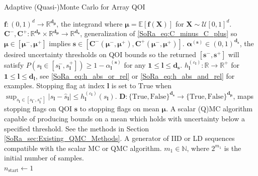 \documentclass[graybox]{svmult}
\begin{document}
\begin{algorithm}[t]
    \caption{Adaptive (Quasi-)Monte Carlo for Array QOI}
    \label{SoRa_algo:MCStoppingCriterion}
    \begin{algorithmic}
    \Require $\boldsymbol{f}: (0,1)^d \to \mathbb{R}^{\boldsymbol{d}_{\boldsymbol{\mu}}}$, the integrand where $\boldsymbol{\mu} = \mathbb{E}[\boldsymbol{f}(\boldsymbol{X})]$ for $\boldsymbol{X} \sim \mathcal{U}[0,1]^d$.
    \Require $\boldsymbol{C}^-,\boldsymbol{C}^+: \mathbb{R}^{\boldsymbol{d}_{\boldsymbol{\mu}}} \times \mathbb{R}^{\boldsymbol{d}_{\boldsymbol{\mu}}} \to \mathbb{R}^{\boldsymbol{d}_{\boldsymbol{s}}}$, generalization of \eqref{SoRa_eq:C_minus_C_plus} so $\boldsymbol{\mu} \in [\boldsymbol{\mu}^-,\boldsymbol{\mu}^+]$ implies $\boldsymbol{s} \in [\boldsymbol{C}^-(\boldsymbol{\mu}^-,\boldsymbol{\mu}^+),\boldsymbol{C}^+(\boldsymbol{\mu}^-,\boldsymbol{\mu}^+)]$.
    \Require $\boldsymbol{\alpha}^{(\boldsymbol{s})} \in (0,1)^{\boldsymbol{d}_{\boldsymbol{s}}}$, the desired uncertainty thresholds on QOI bounds so the returned $[\boldsymbol{s}^-,\boldsymbol{s}^+]$ will satisfy $P(s_{\boldsymbol{l}} \in [s_{\boldsymbol{l}}^-,s_{\boldsymbol{l}}^+]) \geq 1-\alpha^{(\boldsymbol{s})}_{\boldsymbol{l}}$ for any $\boldsymbol{1} \leq \boldsymbol{l} \leq \boldsymbol{d}_{\boldsymbol{s}}$.
    \Require $h^{(\varepsilon_{\boldsymbol{l}})}_{\boldsymbol{l}}: \mathbb{R} \to \mathbb{R}^+$ for $\boldsymbol{1} \leq \boldsymbol{l} \leq \boldsymbol{d}_{\boldsymbol{l}}$, see \eqref{SoRa_eq:h_abs_or_rel} or \eqref{SoRa_eq:h_abs_and_rel} for examples. Stopping flag at index $\boldsymbol{l}$ is set to $\text{True}$ when $\sup_{s_{\boldsymbol{l}} \in [s_{\boldsymbol{l}}^-,s_{\boldsymbol{l}}^+]} \lvert s_{\boldsymbol{l}} - \hat{s}_{\boldsymbol{l}} \rvert \leq h^{(\varepsilon_{\boldsymbol{l}})}_{\boldsymbol{l}}(s_{\boldsymbol{l}})$.
    \Require $\boldsymbol{D}: \{\text{True},\text{False}\}^{\boldsymbol{d}_{\boldsymbol{s}}} \to \{\text{True},\text{False}\}^{\boldsymbol{d}_{\boldsymbol{\mu}}}$, maps stopping flags on QOI $\boldsymbol{s}$ to stopping flags on mean $\boldsymbol{\mu}$. 
    \Require A scalar (Q)MC algorithm capable of producing bounds on a mean which holds with uncertainty below a specified threshold. See the methods in Section \ref{SoRa_sec:Existing_QMC_Methods}.
    \Require A generator of IID or LD sequences compatible with the scalar MC or QMC algorithm. 
    \Require $m_1 \in \mathbb{N}$, where $2^{m_1}$ is the initial number of samples.
    \\ \hrulefill
    \State $n_\text{start} \gets 1$ 

\end{algorithmic}
\end{algorithm}
\end{document}

